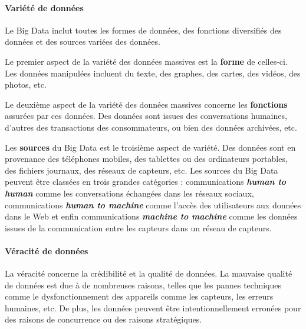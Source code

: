 		\paragraph{Variété de données} \label{variete-data}
		
		Le Big Data inclut toutes les formes de données, des fonctions diversifiés des données et des sources variées des données.
		
		Le premier aspect de la variété  des données massives est la \textbf{forme} de celles-ci. Les données manipulées incluent du texte, des graphes, des cartes, des vidéos, des photos, etc.
		
		Le deuxième aspect de la variété des données massives concerne les \textbf{fonctions} assurées par ces données. Des données sont issues des conversations humaines, d'autres des transactions des consommateurs, ou bien des données archivées, etc.
		
		Les \textbf{sources} du Big Data est le troisième aspect de  variété. Des données sont en provenance des téléphones mobiles, des tablettes ou des ordinateurs portables, des fichiers journaux, des réseaux de capteurs, etc. Les sources du Big Data peuvent être classées en trois grandes catégories : communications \textbf{\textit{human to human}} comme les conversations échangées dans les réseaux sociaux, communications \textbf{\textit{ human to machine}} comme l'accès des utilisateurs aux données dans le Web et enfin communications \textbf{\textit{machine to machine}} comme les données issues de la communication entre les capteurs dans un réseau de capteurs.
		\paragraph{Véracité de données}
		
		La véracité concerne la crédibilité et la qualité de données. La mauvaise qualité de données est due à de nombreuses raisons, telles que les pannes techniques comme le dysfonctionnement des appareils comme les capteurs, les erreurs humaines,  etc. De plus, les données peuvent être intentionnellement erronées pour des raisons de concurrence ou des raisons stratégiques.
	
